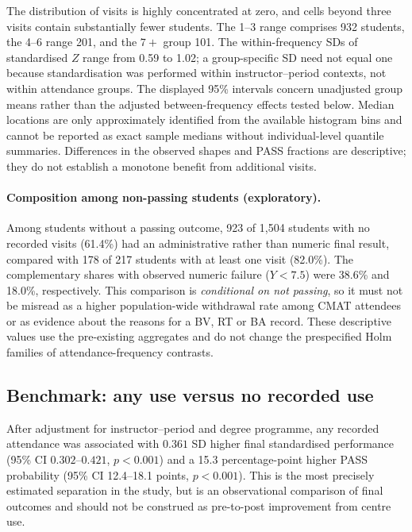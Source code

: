 The distribution of visits is highly concentrated at zero, and cells beyond three visits contain substantially fewer students. The 1--3 range comprises 932 students, the 4--6 range 201, and the $7+$ group 101. The within-frequency SDs of standardised $Z$ range from 0.59 to 1.02; a group-specific SD need not equal one because standardisation was performed within instructor--period contexts, not within attendance groups. The displayed 95\% intervals concern unadjusted group means rather than the adjusted between-frequency effects tested below. Median locations are only approximately identified from the available histogram bins and cannot be reported as exact sample medians without individual-level quantile summaries. Differences in the observed shapes and PASS fractions are descriptive; they do not establish a monotone benefit from additional visits.

\paragraph{Composition among non-passing students (exploratory).}
Among students without a passing outcome, 923 of 1,504 students with no recorded visits (61.4\%) had an administrative rather than numeric final result, compared with 178 of 217 students with at least one visit (82.0\%). The complementary shares with observed numeric failure ($Y<7.5$) were 38.6\% and 18.0\%, respectively. This comparison is \emph{conditional on not passing}, so it must not be misread as a higher population-wide withdrawal rate among CMAT attendees or as evidence about the reasons for a BV, RT or BA record. These descriptive values use the pre-existing aggregates and do not change the prespecified Holm families of attendance-frequency contrasts.

\subsection{Benchmark: any use versus no recorded use}

After adjustment for instructor--period and degree programme, any recorded attendance was associated with $0.361$ SD higher final standardised performance (95\% CI $0.302$--$0.421$, $p<0.001$) and a 15.3 percentage-point higher PASS probability (95\% CI 12.4--18.1 points, $p<0.001$). This is the most precisely estimated separation in the study, but is an observational comparison of final outcomes and should not be construed as pre-to-post improvement from centre use.

